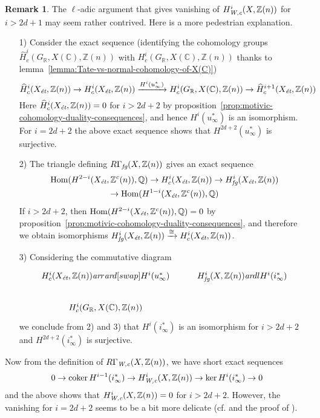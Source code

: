 \documentclass[leqno,12pt]{article}
\theoremstyle{plain}
\theoremstyle{definition}
\newtheorem{remark}[theorem]{\indent\sc Remark}
\DeclareMathOperator{\Hom}{Hom}
\DeclareMathOperator{\coker}{coker}
\newcommand{\CC}{\mathbb{C}}
\newcommand{\QQ}{\mathbb{Q}}
\newcommand{\RR}{\mathbb{R}}
\newcommand{\ZZ}{\mathbb{Z}}
\newcommand{\Wc}{\text{\it W,c}}
\newcommand{\ar}{\text{\it ar}}
\newcommand{\et}{\text{\it \'{e}t}}
\newcommand{\fg}{\text{\it fg}}
\begin{document}
\begin{remark}
  The $\ell$-adic argument that gives vanishing of $H^i_\Wc (X, \ZZ(n))$ for
  $i > 2d+1$ may seem rather contrived. Here is a more pedestrian explanation.

  \begin{enumerate}
  \item[1)] Consider the exact sequence
    (identifying the cohomology groups
    $\widehat{H}^i_c (G_\RR, X (\CC), \ZZ (n))$ with
    $H^i_c (G_\RR, X (\CC), \ZZ (n))$
    thanks to lemma~\ref{lemma:Tate-vs-normal-cohomology-of-X(C)})
    \[ \widehat{H}^i_c (X_\et, \ZZ(n)) \to H^i_c (X_\et, \ZZ(n))
      \xrightarrow{H^i (u_\infty^*)} H^i_c (G_\RR, X (\CC), \ZZ (n)) \to
      \widehat{H}^{i+1}_c (X_\et, \ZZ(n)) \]
    Here $\widehat{H}^i_c (X_\et, \ZZ(n)) = 0$ for $i > 2d+2$
    by proposition~\ref{prop:motivic-cohomology-duality-consequences},
    and hence $H^i (u_\infty^*)$ is an isomorphism.
    For $i = 2d+2$ the above exact sequence shows that $H^{2d+2} (u_\infty^*)$
    is surjective.

  \item[2)] The triangle defining $R\Gamma_\fg (X, \ZZ(n))$ gives an exact sequence
    \begin{multline*}
      \Hom (H^{2-i} (X_\et, \ZZ^c (n)), \QQ) \to
      H^i_c (X_\et, \ZZ(n)) \to
      H^i_\fg (X_\et, \ZZ(n)) \\
      \to \Hom (H^{1-i} (X_\et, \ZZ^c (n)), \QQ)
    \end{multline*}
    If $i > 2d + 2$, then $\Hom (H^{2-i} (X_\et, \ZZ^c (n)), \QQ) = 0$ by
    proposition~\ref{prop:motivic-cohomology-duality-consequences}, and
    therefore we obtain isomorphisms
    $H^i_\fg (X_\et, \ZZ(n)) \xrightarrow{\cong} H^i_c (X_\et, \ZZ(n))$.

  \item[3)] Considering the commutative diagram
    \[ \begin{tikzcd}
        H^i_c (X_\et, \ZZ(n)) \ar{r}\ar{d}[swap]{H^i (u_\infty^*)} & H^i_\fg (X, \ZZ(n))\ar{dl}{H^i (i_\infty^*)} \\
        H^i_c (G_\RR, X (\CC), \ZZ (n))
      \end{tikzcd} \]
    we conclude from 2) and 3) that $H^i (i_\infty^*)$ is an isomorphism for
    $i > 2d+2$ and $H^{2d+2} (i_\infty^*)$ is surjective.
  \end{enumerate}

  Now from the definition of $R\Gamma_\Wc (X, \ZZ(n))$, we have short exact
  sequences
  \[ 0 \to \coker H^{i-1} (i_\infty^*) \to
    H^i_\Wc (X, \ZZ(n)) \to
    \ker H^i (i_\infty^*) \to 0 \]
  and the above shows that $H^i_\Wc (X, \ZZ(n)) = 0$ for $i > 2d+2$.
  However, the vanishing for $i = 2d+2$ seems to be a bit more delicate
  (cf. \cite[p.\,991]{Kahn-2003-equivalences} and the proof of
  \cite[Theorem~7.3]{Geisser-2004}).
\end{remark}
\end{document}
